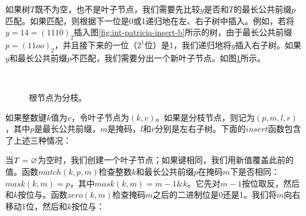 \documentclass[b5paper]{ctexart}
\begin{document}
如果树$T$既不为空，也不是叶子节点，我们需要先比较$y$是否和$T$的最长公共前缀$p$匹配。如果匹配，则根据下一位是0或1递归地在左、右子树中插入。例如，若将$y = 14 = (1110)_2$插入图\ref{fig:int-patricia-insert-b}所示的树，由于最长公共前缀$p = (11oo)_2$，并且接下来的一位（$2^1$位）是1，我们递归地将$y$插入右子树。如果$y$和最长公共前缀$p$不匹配，我们需要分出一个新叶子节点。如图\ref{fig:int-patricia-insert-c}所示。

\begin{figure}[htbp]
  \centering
  \\
  \caption{根节点为分枝。}
  \label{fig:int-patricia-insert-c}
\end{figure}

如果整数键$k$值为$v$，令叶子节点为$(k, v)$。如果是分枝节点，则记为$(p, m, l, r)$，其中$p$是最长公共前缀，$m$是掩码，$l$和$r$分别是左右子树。下面的$insert$函数包含了上述三种情况：

\be
{}
\ee

当$T = \varnothing$为空时，我们创建一个叶子节点；如果键相同，我们用新值覆盖此前的值。函数$match(k, p, m)$检查整数$k$和最长公共前缀$p$在掩码$m$下是否相同：$mask(k, m) = p$，其中$mask(k, m) = \overline{m-1} \& k$。它先对$m - 1$按位取反，然后和$k$按位与。函数$zero(k, m)$检查掩码$m$之后的二进制位是0还是1。我们将$m$向右移动1位，然后和$k$按位与：
\end{document}
